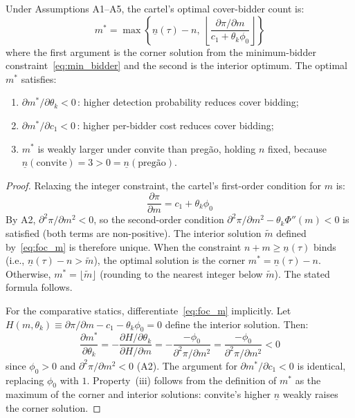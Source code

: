 \begin{proposition}
\label{prop:optimal_m}
Under Assumptions A1--A5, the cartel's optimal cover-bidder count is:
\begin{equation}
  m^* = \max\!\left\{\underline{n}(\tau) - n, \;
  \left\lfloor \frac{\partial \pi / \partial m}{c_1 + \theta_k \phi_0}
  \right\rfloor \right\}
  \label{eq:optimal_m}
\end{equation}
\noindent where the first argument is the corner solution from the
minimum-bidder constraint~\eqref{eq:min_bidder} and the second is the
interior optimum. The optimal $m^*$ satisfies:
\begin{enumerate}
  \item[(i)] $\partial m^* / \partial \theta_k < 0$\,: higher detection
    probability reduces cover bidding;
  \item[(ii)] $\partial m^* / \partial c_1 < 0$\,: higher per-bidder
    cost reduces cover bidding;
  \item[(iii)] $m^*$ is weakly larger under convite than preg\~ao,
    holding $n$ fixed, because $\underline{n}(\text{convite}) = 3 >
    0 = \underline{n}(\text{preg\~ao})$.
\end{enumerate}
\end{proposition}

\begin{proof}
Relaxing the integer constraint, the cartel's first-order condition
for $m$ is:
\begin{equation}
  \frac{\partial \pi}{\partial m} = c_1 + \theta_k \phi_0
  \label{eq:foc_m}
\end{equation}
By A2, $\partial^2 \pi / \partial m^2 < 0$, so the second-order
condition $\partial^2 \pi / \partial m^2 - \theta_k \Phi''(m) < 0$
is satisfied (both terms are non-positive). The interior solution
$\tilde{m}$ defined by~\eqref{eq:foc_m} is therefore unique. When
the constraint $n + m \geq \underline{n}(\tau)$ binds (i.e.,
$\underline{n}(\tau) - n > \tilde{m}$), the optimal solution is
the corner $m^* = \underline{n}(\tau) - n$. Otherwise,
$m^* = \lfloor \tilde{m} \rfloor$ (rounding to the nearest integer
below $\tilde{m}$). The stated formula follows.

For the comparative statics, differentiate~\eqref{eq:foc_m} implicitly.
Let $H(m, \theta_k) \equiv \partial \pi / \partial m - c_1 -
\theta_k \phi_0 = 0$ define the interior solution. Then:
\[
  \frac{\partial m^*}{\partial \theta_k} =
  -\frac{\partial H / \partial \theta_k}{\partial H / \partial m}
  = -\frac{-\phi_0}{\partial^2 \pi / \partial m^2}
  = \frac{-\phi_0}{\partial^2 \pi / \partial m^2} < 0
\]
since $\phi_0 > 0$ and $\partial^2 \pi / \partial m^2 < 0$ (A2).
The argument for $\partial m^* / \partial c_1 < 0$ is identical,
replacing $\phi_0$ with $1$. Property~(iii) follows from the
definition of $m^*$ as the maximum of the corner and interior
solutions: convite's higher $\underline{n}$ weakly raises the corner
solution.
\end{proof}

